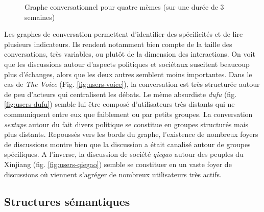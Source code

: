 \begin{figure}[h!]
{    }
    
  \caption{  
    Graphe conversationnel pour quatre mèmes (sur une durée de 3 semaines)
  }
\end{figure}

Les graphes de conversation permettent d{\textquoteright}identifier des spécificités et de lire plusieurs indicateurs. Ils rendent notamment bien compte de la taille des conversations, très variables, ou plut\^ot de la dimension des interactions. On voit que les discussions autour d{\textquoteright}aspects politiques et sociétaux suscitent beaucoup plus d{\textquoteright}échanges, alors que les deux autres semblent moins importantes. Dans le cas de \textit{The Voice} (Fig. \ref{fig:users-voice}), la conversation est très structurée autour de peu d{\textquoteright}acteurs qui centralisent les débats. Le mème absurdiste \textit{dufu} (fig. \ref{fig:users-dufu}) semble lui être composé d{\textquoteright}utilisateurs très distants qui ne communiquent entre eux que faiblement ou par petits groupes. La conversation \textit{sextape }autour du fait divers politique se constitue en groupes structurés mais plus distants. Repoussés vers les bords du graphe, l{\textquoteright}existence de nombreux foyers de discussions montre bien que la discussion a était canalisé autour de groupes spécifiques. A l{\textquoteright}inverse, la discussion de société \textit{qiegao}\textit{ }autour des peuples du Xinjiang (fig. \ref{fig:users-qiegao}) semble se constituer en un vaste foyer de discussions o\`u viennent s{\textquoteright}agréger de nombreux utilisateurs très actifs. 

\subsection[Structures sémantiques]{Structures sémantiques}

